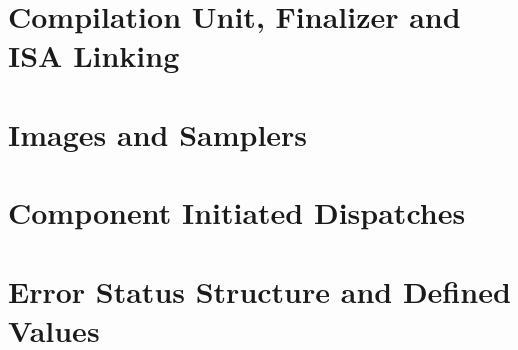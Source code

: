 \documentclass{book}
\begin{document}
\begin{appendices}
\chapter{Compilation Unit, Finalizer and ISA Linking}
\label{finalizerchapter} \hypertarget{finalizerchapter}{}


\chapter{Images and Samplers}
\label{images} \hypertarget{images}{}


\chapter{Component Initiated Dispatches} \label{architected}
\hypertarget{architectedchptr}{}


\chapter{Error Status Structure and Defined Values}
\label{errstatus} \hypertarget{errstatus}{}


\end{appendices}



\end{document}
